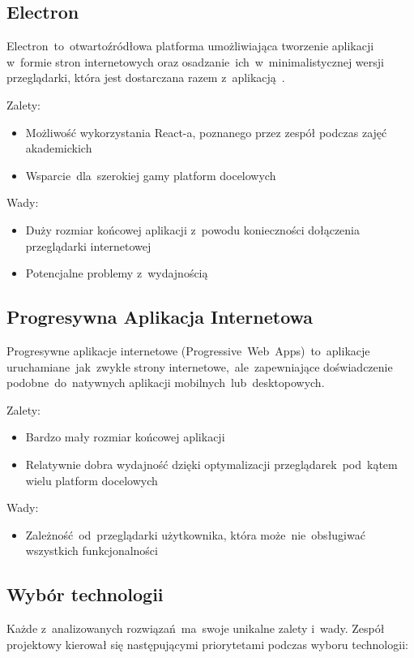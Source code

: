 \subsection{Electron}\label{subsec:electron}
Electron~to~otwartoźródłowa platforma umożliwiająca tworzenie aplikacji w~formie stron internetowych oraz osadzanie~ich~w~minimalistycznej wersji przeglądarki, która jest dostarczana razem z~aplikacją~\cite{electron-in-action}.

Zalety:
\begin{itemize}
    \item Możliwość wykorzystania React-a, poznanego przez zespół podczas zajęć akademickich
    \item Wsparcie~dla~szerokiej gamy platform docelowych
\end{itemize}

Wady:
\begin{itemize}
    \item Duży rozmiar końcowej aplikacji z~powodu konieczności dołączenia przeglądarki internetowej
    \item Potencjalne problemy z~wydajnością
\end{itemize}

\subsection{Progresywna Aplikacja Internetowa}\label{subsec:progresywna-aplikacja-internetowa}
Progresywne aplikacje internetowe (Progressive~Web~Apps)~to~aplikacje uruchamiane~jak~zwykłe strony internetowe,~ale~zapewniające doświadczenie podobne~do~natywnych aplikacji mobilnych~lub~desktopowych.\cite{pwa-book}

Zalety:
\begin{itemize}
    \item Bardzo mały rozmiar końcowej aplikacji
    \item Relatywnie dobra wydajność dzięki optymalizacji przeglądarek~pod~kątem wielu platform docelowych
\end{itemize}

Wady:
\begin{itemize}
    \item Zależność~od~przeglądarki użytkownika, która może~nie~obsługiwać wszystkich funkcjonalności
\end{itemize}

\subsection{Wybór technologii}\label{subsec:wybor-technologii}
Każde z~analizowanych rozwiązań~ma~swoje unikalne zalety i~wady.
Zespół projektowy kierował się następującymi priorytetami podczas wyboru technologii:


